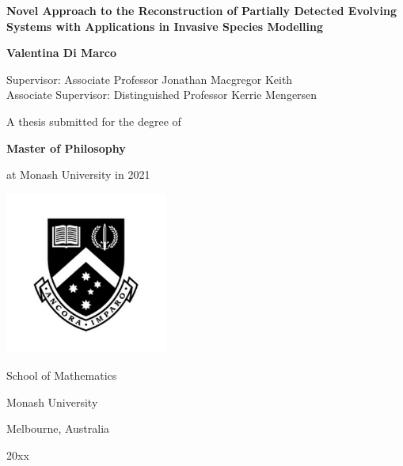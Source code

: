 \begin{titlepage}
  \begin{center}
    \vspace*{\fill}

\begin{center}
    { %
      \textbf{
        \Large Novel Approach to the Reconstruction of Partially Detected Evolving Systems with Applications in Invasive Species Modelling
              } 
    }
\end{center}
    
    \vspace{2cm}
    
    {
      \Large
      \textbf{Valentina Di Marco}
    }

    \vspace{0.3cm}
    
    {
      \normalsize
      Supervisor: Associate Professor Jonathan Macgregor Keith \\
      Associate Supervisor: Distinguished Professor Kerrie Mengersen
      
    }
    
    \vspace{3cm}

    {
      \large
      A thesis submitted for the degree of

      \vspace{0.25cm}
      
      \textbf{Master of Philosophy}

      \vspace{0.25cm}
      
      at Monash University in 2021
    }
    
    \vspace{2.5cm}

    {
      \includegraphics[width=0.4\textwidth]{monash-logo}
    }

    {
      School of Mathematics
      
      Monash University
      
      Melbourne, Australia
      
      20xx
    }
    
    \vspace*{\fill}
  \end{center}
\end{titlepage}

\clearpage
